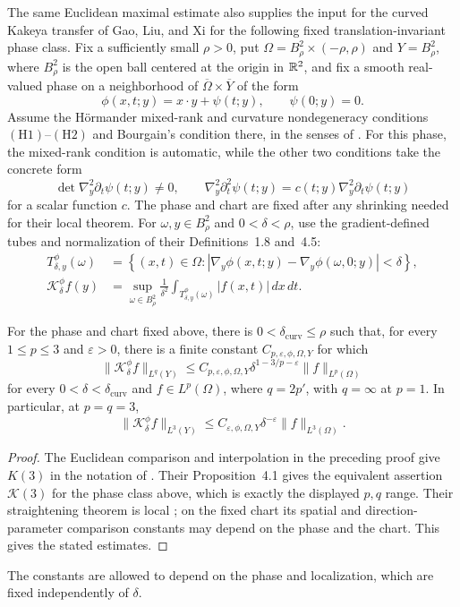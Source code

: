The same Euclidean maximal estimate also supplies the input for the
curved Kakeya transfer of Gao, Liu, and Xi for the following fixed
translation-invariant phase class. Fix a sufficiently small \(\rho>0\), put
\(\Omega=B_\rho^2\times(-\rho,\rho)\) and \(Y=B_\rho^2\), where
\(B_\rho^2\) is the open ball centered at the origin in \(\mathbb R^2\), and fix a
smooth real-valued phase on a neighborhood of
\(\overline{\Omega}\times\overline{Y}\) of the form
\[
\phi(x,t;y)=x\cdot y+\psi(t;y),\qquad \psi(0;y)=0.
\]
Assume the H\"ormander mixed-rank and curvature nondegeneracy conditions
\((\mathrm{H1})\)--\((\mathrm{H2})\) and Bourgain's condition there, in
the senses of \citet[Definitions~1.7, 1.10, and~1.11]{GLX2025}. For this phase, the mixed-rank condition is automatic, while the other
two conditions take the concrete form
\[
\det\nabla_y^2\partial_t\psi(t;y)\ne0,\qquad
\nabla_y^2\partial_t^2\psi(t;y)
=c(t;y)\nabla_y^2\partial_t\psi(t;y)
\]
for a scalar function \(c\). The phase and chart are fixed after any
shrinking needed for their local theorem.
For \(\omega,y\in B_\rho^2\) and \(0<\delta<\rho\), use the
gradient-defined tubes and normalization of their Definitions~1.8
and~4.5:
\begin{align*}
T^\phi_{\delta,y}(\omega)
&=\left\{(x,t)\in\Omega:
 \left|\nabla_y\phi(x,t;y)-\nabla_y\phi(\omega,0;y)\right|<\delta\right\},\\
\mathcal K^\phi_\delta f(y)
&=\sup_{\omega\in B_\rho^2}\frac1{\delta^2}
 \int_{T^\phi_{\delta,y}(\omega)}|f(x,t)|\,dx\,dt .
\end{align*}

\begin{corollary}
\label{cor:curved-kakeya-local}
For the phase and chart fixed above, there is
\(0<\delta_{\mathrm{curv}}\le\rho\) such that, for every
\(1\le p\le3\) and \(\varepsilon>0\), there is a finite constant
\(C_{p,\varepsilon,\phi,\Omega,Y}\) for which
\[
\|\mathcal K^\phi_\delta f\|_{L^q(Y)}
\le C_{p,\varepsilon,\phi,\Omega,Y}
   \delta^{1-3/p-\varepsilon}\|f\|_{L^p(\Omega)}
\]
for every \(0<\delta<\delta_{\mathrm{curv}}\) and \(f\in L^p(\Omega)\),
where \(q=2p'\), with \(q=\infty\) at \(p=1\). In particular, at
\(p=q=3\),
\[
\|\mathcal K^\phi_\delta f\|_{L^3(Y)}
\le C_{\varepsilon,\phi,\Omega,Y}\delta^{-\varepsilon}
   \|f\|_{L^3(\Omega)}.
\]
\end{corollary}

\begin{proof}
The Euclidean comparison and interpolation in the preceding proof give
\(K(3)\) in the notation of \citet[equation~(6)]{GLX2025}. Their
Proposition~4.1 gives the equivalent assertion \(\mathcal K(3)\) for
the phase class above, which is exactly the displayed \(p,q\) range.
Their straightening theorem is local
\citep[Theorem~1.12]{GLX2025}; on the fixed chart its spatial and
direction-parameter comparison constants may depend on the phase and
the chart. This gives the stated estimates.
\end{proof}

The constants are allowed to depend on the phase and localization,
which are fixed independently of \(\delta\).

